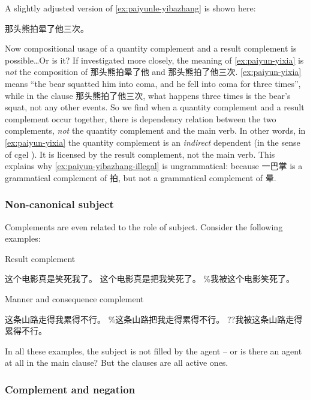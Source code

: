 \documentclass[../main.tex]{subfiles}
\begin{document}
A slightly adjusted version of \eqref{ex:paiyunle-yibazhang} is shown here:
\begin{exe}
    \ex 那头熊拍晕了他三次。
    \label{ex:paiyun-yixia}
\end{exe}
Now compositional usage of a quantity complement and a result complement is possible\dots Or is it?
If investigated more closely, the meaning of \eqref{ex:paiyun-yixia} is \emph{not} the composition 
of 那头熊拍晕了他 and 那头熊拍了他三次. \eqref{ex:paiyun-yixia} means ``the bear squatted him into
coma, and he fell into coma for three times'', while in the clause 那头熊拍了他三次, what happens 
three times is the bear's squat, not any other events. So we find when a quantity complement 
and a result complement occur together, there is dependency relation between the two complements, 
\emph{not} the quantity complement and the main verb. In other words, in \eqref{ex:paiyun-yixia}
the quantity complement is an \emph{indirect} dependent (in the sense of \ac{cgel} ). 
It is licensed by the result complement, not the main verb. This explains why \eqref{ex:paiyun-yibazhang-illegal}
is ungrammatical: because 一巴掌 is a grammatical complement of 拍, but not a grammatical complement of 晕.

\subsubsection{Non-canonical subject}

Complements are even related to the role of subject. Consider the following examples:
\begin{exe}
    \ex Result complement
    \begin{xlist}
        \ex 这个电影真是笑死我了。
        \ex 这个电影真是把我笑死了。
        \ex \%我被这个电影笑死了。 %
    \end{xlist}
    \ex Manner and consequence complement 
    \begin{xlist}
        \ex 这条山路走得我累得不行。
        \ex \%这条山路把我走得累得不行。 %
        \ex ??我被这条山路走得累得不行。
    \end{xlist}
\end{exe}

In all these examples, the subject is not filled by the agent -- or is there an agent at all in the main clause?
But the clauses are all active ones. 

\subsubsection{Complement and negation}
\end{document}
